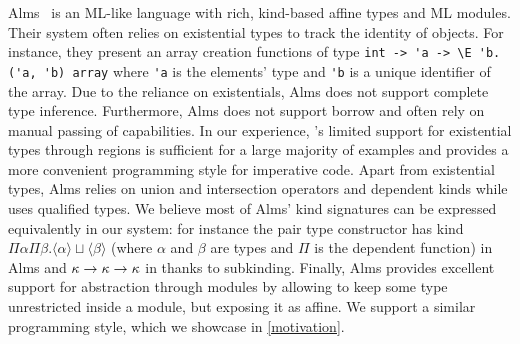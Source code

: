 
Alms~\citep{DBLP:conf/popl/TovP11} is an ML-like language with rich, kind-based
affine types and ML modules.
Their system often relies on existential types to track the identity
of objects. For instance, they present an array creation
functions of type \lstinline/int -> 'a -> \E 'b. ('a, 'b) array/ where
\lstinline/'a/ is the elements' type and \lstinline/'b/
is a unique identifier of the array.
Due to the reliance on existentials, Alms does not support complete type inference.
Furthermore, Alms does not support borrow and often rely
on manual passing of capabilities.
In our experience, \affe's limited support for existential types through
regions is sufficient for a large majority of examples and provides
a more convenient programming style for imperative code.
%
Apart from existential types, Alms relies
on union and intersection operators and dependent kinds while
\lang uses qualified types.
We believe most of Alms' kind signatures can be expressed equivalently in
our system: for instance the pair type constructor
has kind $\Pi\alpha\Pi\beta. \langle\alpha\rangle \sqcup \langle\beta\rangle$
(where $\alpha$ and $\beta$ are types and $\Pi$ is the dependent function)
in Alms and $\kappa\to\kappa\to\kappa$ in \lang thanks
to subkinding.
%
Finally, Alms provides excellent support for abstraction through
modules by allowing to keep some type unrestricted inside a module, but
exposing it as affine. We support a similar programming style, which
we showcase in \cref{motivation}.

